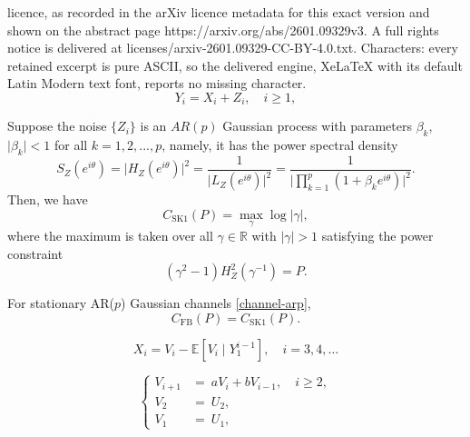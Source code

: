 \documentclass[10pt,a4paper]{amsart}
\newcommand{\E}{\mathbb{E}}
\begin{document}
licence, as recorded in the arXiv licence metadata for this exact version and shown on the abstract page https://arxiv.org/abs/2601.09329v3. A full rights notice is delivered at licenses/arxiv-2601.09329-CC-BY-4.0.txt. Characters: every retained excerpt is pure ASCII, so the delivered engine, XeLaTeX with its default Latin Modern text font, reports no missing character.
\begin{equation}\label{channel-arp}
Y_i = X_i + Z_i, \quad i\ge 1,
\end{equation}

\begin{thm}\label{ISK1-thm}
Suppose the noise $\{ Z_i \}$ is an $AR(p)$ Gaussian process with parameters $\beta_k$, $\vert \beta_k\vert<1$ for all $k=1,2,...,p$, namely, it has the power spectral density
\begin{equation*}
S_Z(e^{i\theta}) = \vert H_Z(e^{i\theta}) \vert^2 = \frac{1}{\vert L_Z(e^{i\theta}) \vert^2} = \frac{1}{\vert\prod_{k=1}^{p}(1+\beta_ke^{i\theta})\vert^2}.
\end{equation*}
Then, we have
\begin{equation}\label{I-SK1-thm}
C_\mathrm{SK1}(P)= \max_{\gamma} \log  |\gamma|,
\end{equation}
where the maximum is taken over all $\gamma\in\mathbb{R}$ with $|\gamma|>1$ satisfying the power constraint 
\begin{equation}\label{power-eqn-sk1-thm}
   (\gamma^2-1)H^2_Z(\gamma^{-1}) = P.
\end{equation}
\end{thm}

\begin{conj}\label{Butman-conj:label}
For stationary AR($p$) Gaussian channels \eqref{channel-arp},
\[
    C_{\mathrm{FB}}(P)=C_{\mathrm{SK1}}(P).
\]
\end{conj}

\begin{equation}\label{SK2-coding-input}
X_i = V_i - \E{[V_i\mid Y_1^{i-1}]}, \quad i=3,4,\dots
\end{equation}

\begin{equation}\label{SK2-coding-message}
\left\{ 
\begin{aligned}
V_{i+1} &= ~aV_i + bV_{i-1},\quad i\ge2,\\
V_2 ~~&= ~U_2,\\
V_1 ~~&= ~U_1,
\end{aligned}
\right.
\end{equation}
\end{document}
